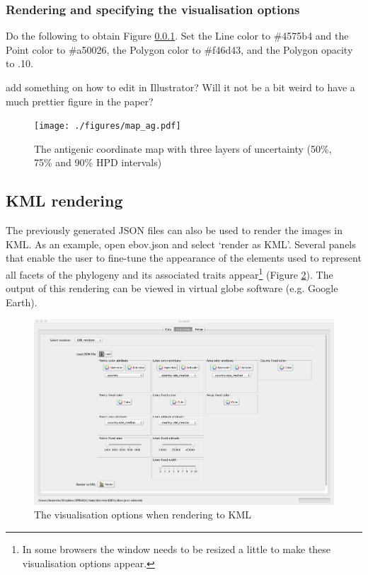 \documentclass[english]{paper}
\begin{document}
\subsubsection{Rendering and specifying the visualisation options}

Do the following to obtain Figure \ref{}.
Set the Line color to \#4575b4 and the Point color to \#a50026, the Polygon color to \#f46d43, and the Polygon opacity to .10.
\par
add something on how to edit in Illustrator? Will it not be a bit weird to have a much prettier figure in the paper?

\begin{figure}[!H]
\centering
\texttt{[image: ./figures/map\_ag.pdf]} 
\caption{The antigenic coordinate map with three layers of uncertainty (50\%, 75\% and 90\% HPD intervals)}
\label{fig:mergeTipsTricks}
\end{figure}


\subsection{KML rendering}
\label{kmlRender}

The previously generated JSON files can also be used to render the images in KML. 
As an example, open ebov.json and select `render as KML'.
Several panels that enable the user to fine-tune the appearance of the elements used to represent all facets of the phylogeny and its associated traits appear\footnote{In some browsers the window needs to be resized a little to make these visualisation options appear.} (Figure \ref{fig:KMLrender}).
The output of this rendering can be viewed in virtual globe software (e.g. Google Earth).

\begin{figure}[!H]
\centering
\includegraphics[width=1\textwidth]{./figures/kml_render.pdf} 
\caption{The visualisation options when rendering to KML}
\label{fig:KMLrender}
\end{figure}
\end{document}
